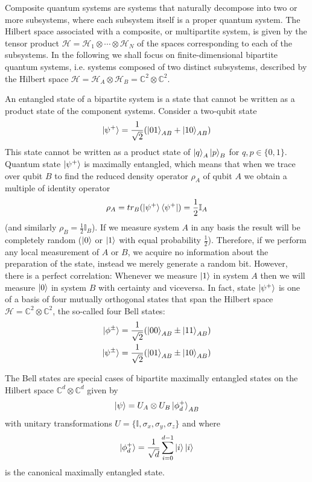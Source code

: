 \documentclass[10pt,a4paper]{book}
\numberwithin{equation}{chapter}
\numberwithin{figure}{chapter}
\numberwithin{table}{chapter}
\begin{document}
Composite quantum systems are systems that naturally decompose into two or more subsystems, where each subsystem itself is a proper quantum system. The Hilbert space associated with a composite, or multipartite system, is given by the tensor product $\mathcal{H}=\mathcal{H}_1 \otimes \cdots \otimes \mathcal{H}_N$ of the spaces corresponding to each of the subsystems. In the following we shall focus on finite-dimensional bipartite quantum systems, i.e. systems composed of two distinct subsystems, described by the Hilbert space $\mathcal{H}=\mathcal{H}_A \otimes \mathcal{H}_B=\mathbb{C}^2 \otimes \mathbb{C}^2$. 

An entangled state of a bipartite system is a state that cannot be written as a product state of the component systems. Consider a two-qubit state
\begin{equation}
\ket{\psi^{+}}=\frac{1}{\sqrt{2}}(\ket{01}_{AB}+\ket{10}_{AB})
\end{equation}
This state cannot be written as a product state of $\ket{q}_A \ket{p}_B$ for $q,p \in \lbrace 0,1 \rbrace$. Quantum state $\ket{\psi^{+}}$ is maximally entangled, which means that when we trace over qubit $B$ to find the reduced density operator $\rho_A$ of qubit $A$ we obtain a multiple of identity operator
\begin{equation}
\rho_A = tr_B (\ket{\psi^{+}}\bra{\psi^{+}})=\frac{1}{2}\mathbb{I}_A
\end{equation}
(and similarly $\rho_B =\frac{1}{2}\mathbb{I}_B$). If we measure system $A$ in any basis the result will be completely random ($\ket{0}$ or $\ket{1}$ with equal probability $\frac{1}{2}$). Therefore, if we perform any local measurement of $A$ or $B$, we acquire no information about the preparation of the state, instead we merely generate a random bit. However, there is a perfect correlation: Whenever we measure $\ket{1}$ in system $A$ then we will measure $\ket{0}$ in system $B$ with certainty and viceversa. In fact, state $\ket{\psi^{+}}$ is one of a basis of four mutually orthogonal states that span the Hilbert space $\mathcal{H}=\mathbb{C}^2 \otimes \mathbb{C}^2$, the so-called four Bell states:
\begin{align}\label{Bellstates}
\nonumber \ket{\phi^{\pm}}&=\frac{1}{\sqrt{2}}(\ket{00}_{AB}\pm\ket{11}_{AB})\\
\nonumber \ket{\psi^{\pm}}&=\frac{1}{\sqrt{2}}(\ket{01}_{AB}\pm\ket{10}_{AB})\\
\end{align}

The Bell states are special cases of bipartite maximally entangled states on the Hilbert space $\mathbb{C}^d \otimes \mathbb{C}^d$ given by
\begin{equation}
\ket{\psi}=U_A \otimes U_B \ket{\phi^{+}_{d}}_{AB}
\end{equation}
with unitary transformations $U = \lbrace \mathbb{I},\sigma_x ,\sigma_y ,\sigma_z \rbrace $ and where
\begin{equation}
\ket{\phi^{+}_{d}}=\frac{1}{\sqrt{d}}\sum^{d-1}_{i=0} \ket{i}\ket{i}
\label{eq:canonical}
\end{equation}
is the canonical maximally entangled state.
\end{document}
